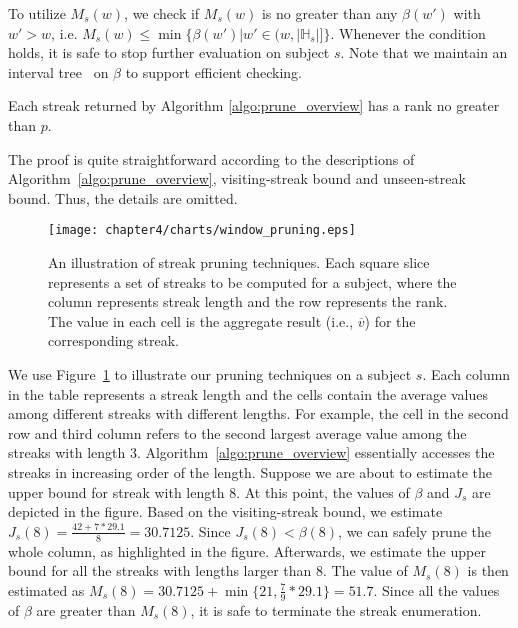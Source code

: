 To utilize $M_s(w)$, %
we check if $M_s(w)$ is no greater  
than any $\beta(w')$ with $w' >w$,  i.e. $M_s(w) \leq \min\{\beta(w')|w' \in (w ,|\mathbb{H}_s|]\}$. Whenever the condition holds, it is safe to stop further evaluation on subject $s$.
Note that we maintain an interval tree~\cite{Berg1997Computational} 
on $\beta$ to support efficient checking. 

\begin{theorem}
\label{thm:window_prune}
Each streak returned by Algorithm \ref{algo:prune_overview} has a rank no greater than $p$. 
\end{theorem}
The proof is quite straightforward according to the descriptions of Algorithm~\ref{algo:prune_overview}, visiting-streak bound and unseen-streak bound. Thus, the details are omitted.

\begin{figure}[t]
\centering
\texttt{[image: chapter4/charts/window\_pruning.eps]}
	\caption{An illustration of streak pruning techniques. Each square slice represents a
	set of streaks to be computed for a subject, where the column represents streak length and the row represents
	the rank. The value in each cell is the aggregate result (i.e., $\overline{v}$) for the corresponding streak.}
\label{fig:window_pruning}
\end{figure}

\begin{example}
We use Figure~\ref{fig:window_pruning} to illustrate our pruning techniques on a subject $s$.  Each column in the table represents a streak length and the cells contain the average values among different streaks with different lengths. For example, the cell in the second row and third column refers to the second largest average value among the streaks with length $3$. Algorithm~\ref{algo:prune_overview} essentially accesses the streaks in increasing order of the length. Suppose we are about to estimate the upper bound for streak with length $8$. At this point, the values of $\beta$ and $J_s$ are depicted in the figure. 
Based on the visiting-streak bound, we estimate $J_s(8) = \frac{42+7*29.1}{8}= 30.7125$. Since $J_s(8) < \beta(8)$, we can safely prune the whole column, as highlighted in the figure. Afterwards, we estimate the upper bound for all the streaks with lengths larger than $8$. The value of $M_s(8)$ is then estimated as $M_s(8)= 30.7125 + \min\{21, \frac{7}{9}*29.1\}=51.7$. Since all the values of $\beta$ are greater than $M_s(8)$, it is safe to terminate the streak enumeration.
\end{example}

